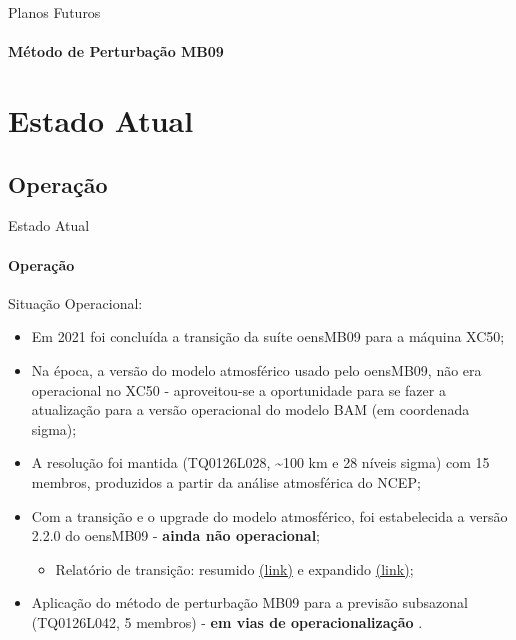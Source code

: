 \documentclass[10pt,aspectratio=169]{beamer}
\begin{document}
\begin{frame}{Planos Futuros}
\framesubtitle{Método de Perturbação MB09}
  \vspace{-1em}
  \begin{figure}[t]
    \centering
    
  \end{figure}
\end{frame}

\section{Estado Atual}

\subsection{Operação}

\begin{frame}{Estado Atual}
\framesubtitle{Operação}
  \begin{block}{Situação Operacional:}
    \begin{itemize}
      \item Em 2021 foi concluída a transição da suíte oensMB09 para a máquina XC50;
    	\pause
			\item Na época, a versão do modelo atmosférico usado pelo oensMB09, não era operacional no XC50 - aproveitou-se a oportunidade para se fazer a atualização para a versão operacional do modelo BAM (em coordenada sigma);
			\pause
			\item A resolução foi mantida (TQ0126L028, \textasciitilde100 km e 28 níveis sigma) com 15 membros, produzidos a partir da análise atmosférica do NCEP;
			\pause
			\item Com a transição e o upgrade do modelo atmosférico, foi estabelecida a versão 2.2.0 \cite{figueroaetal/2016} do oensMB09 - \textbf{ainda não operacional};
			\begin{itemize}
			  \item Relatório de transição: resumido \href{https://s0.cptec.inpe.br/webcptec/sites/dmd/Avalia\%C3\%A7\%C3\%A3o-Modelo-Ensemble-Global-v1.1-2021.pdf}{(\faFile[regular] link)} e expandido \href{https://www.dropbox.com/s/je8q92jpwzc1bnz/16.\%20Relat\%C3\%B3rio\%20-\%20Bastarz\%20et\%20al.\%2C\%202021.pdf?dl=0}{(\faFile[regular] link)};
			\end{itemize}
			\item Aplicação do método de perturbação MB09 para a previsão subsazonal (TQ0126L042, 5 membros) - \textbf{em vias de operacionalização} \cite{guimaraes/2020, guimaraes/2021}.
    \end{itemize}
  \end{block}
\end{frame}
\end{document}
